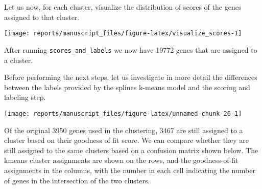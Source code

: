 \documentclass[9pt,a4paper,]{extarticle}
\newenvironment{Shaded}{\begin{snugshade}}{\end{snugshade}}
\newcommand{\CommentTok}[1]{\textcolor[rgb]{0.56,0.35,0.01}{\textit{#1}}}
\newcommand{\ControlFlowTok}[1]{\textcolor[rgb]{0.13,0.29,0.53}{\textbf{#1}}}
\newcommand{\DataTypeTok}[1]{\textcolor[rgb]{0.13,0.29,0.53}{#1}}
\newcommand{\DecValTok}[1]{\textcolor[rgb]{0.00,0.00,0.81}{#1}}
\newcommand{\KeywordTok}[1]{\textcolor[rgb]{0.13,0.29,0.53}{\textbf{#1}}}
\newcommand{\NormalTok}[1]{#1}
\newcommand{\OperatorTok}[1]{\textcolor[rgb]{0.81,0.36,0.00}{\textbf{#1}}}
\newcommand{\StringTok}[1]{\textcolor[rgb]{0.31,0.60,0.02}{#1}}
\begin{document}
Let us now, for each cluster, visualize the distribution of scores of the
genes assigned to that cluster.

\begin{Shaded}
\end{Shaded}

\begin{center}\texttt{[image: reports/manuscript\_files/figure-latex/visualize\_scores-1]} \end{center}

After running \texttt{scores\_and\_labels} we now have 19772 genes that
are assigned to a cluster.

Before performing the next steps, let us investigate in more detail the
differences between the labels provided by the splines k-means model and the
scoring and labeling step.

\begin{center}\texttt{[image: reports/manuscript\_files/figure-latex/unnamed-chunk-26-1]} \end{center}

Of the original 3950 genes used in the
clustering, 3467 are still assigned to a cluster based on their goodness of
fit score. We can compare whether they are still assigned to the same clusters
based on a confusion matrix shown below. The kmeans cluster assignments are
shown on the rows, and the goodness-of-fit assignments in the columns, with
the number in each cell indicating the number of genes in the intersection of
the two clusters.
\end{document}
